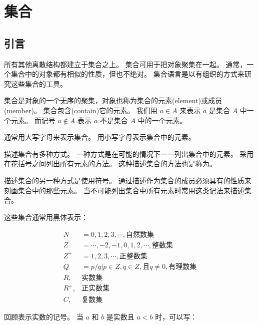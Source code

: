 
\section{集合}
{
    \subsection{引言}
    {
        所有其他离散结构都建立于集合之上。
        集合可用于把对象聚集在一起。
        通常，一个集合中的对象都有相似的性质，但也不绝对。
        集合语言是以有组织的方式来研究这些集合的工具。

        \begin{defines}
            集合是对象的一个无序的聚集，对象也称为集合的元素(element)或成员(member)。
            集合包含(contain)它的元素。
            我们用 $a \in A$ 来表示 $a$ 是集合 $A$ 中一个元素。
            而记号 $a \notin A$ 表示 $a$ 不是集合 $A$ 中的一个元素。
        \end{defines}

        通常用大写字母来表示集合。
        用小写字母表示集合中的元素。

        描述集合有多种方式。
        一种方式是在可能的情况下一一列出集合中的元素。
        采用在花括号之间列出所有元素的方法。
        这种描述集合的方法也是称为。

        描述集合的另一种方式是使用符号。
        通过描述作为集合的成员必须具有的性质来刻画集合中的那些元素。
        当不可能列出集合中所有元素时常用这类记法来描述集合。

        这些集合通常用黑体表示：

        \begin{align*}
            N &= {0, 1, 2, 3, \cdots}, \text{自然数集} \\
            Z &= {\cdots , -2, -1, 0, 1, 2, \cdots}, \text{整数集} \\
            Z^+ &= {1, 2, 3, \cdots}, \text{正整数集} \\
            Q &= {p / q | p \in Z, q \in Z, \text{且} q \neq 0}, \text{有理数集} \\
            R, &\text{实数集} \\
            R^+, &\text{正实数集} \\
            C, &\text{复数集}
        \end{align*}

        回顾表示实数的记号。
        当 $a$ 和 $b$ 是实数且 $a < b$ 时，可以写：

}}
